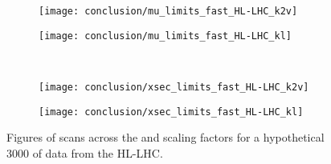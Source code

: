 \begin{figure}
    \centering
    \begin{subfigure}{0.48\textwidth} 
        \texttt{[image: conclusion/mu\_limits\_fast\_HL-LHC\_k2v]}
        \caption{}%
        \label{fig:mulimits_kvv_future}
    \end{subfigure}
    \begin{subfigure}{0.48\textwidth}
        \texttt{[image: conclusion/mu\_limits\_fast\_HL-LHC\_kl]}
        \caption{}%
        \label{fig:mulimits_kl_future}
    \end{subfigure}\\
    \begin{subfigure}{0.48\textwidth} 
        \texttt{[image: conclusion/xsec\_limits\_fast\_HL-LHC\_k2v]}
        \caption{}%
        \label{fig:xseclimits_kvv_future}
    \end{subfigure}
    \begin{subfigure}{0.48\textwidth}
        \texttt{[image: conclusion/xsec\_limits\_fast\_HL-LHC\_kl]}
        \caption{}%
        \label{fig:xseclimits_kl_future}
    \end{subfigure}
    \caption{
        Figures of scans across the \kvv and \kl scaling factors
            for a hypothetical 3000 \ifb of data from the HL-LHC.
    }
    \label{fig:mu_xsec_future}
\end{figure}

